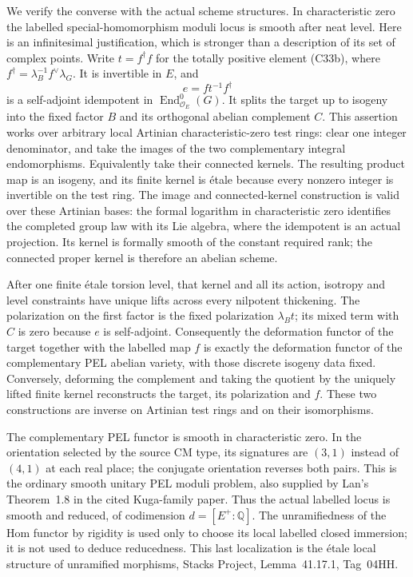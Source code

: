 \documentclass[11pt]{article}
\newcommand{\Q}{\mathbb Q}\newcommand{\C}{\mathbb C}\newcommand{\Z}{\mathbb Z}\newcommand{\R}{\mathbb R}\newcommand{\A}{\mathbb A}\newcommand{\OO}{\mathcal O}
\theoremstyle{definition}\newtheorem{definition}[theorem]{Definition}\newtheorem{remark}[theorem]{Remark}
\begin{document}
We verify the converse with the actual
scheme structures. In characteristic zero
the labelled special-homomorphism moduli
locus is smooth after neat level. Here is
an infinitesimal justification, which is
stronger than a description of its set
of complex points. Write $t=f^\dagger f$
for the totally positive element (C33b),
where $f^\dagger=\lambda_B^{-1}f^\vee\lambda_G$.
It is invertible in $E$, and
\[
                  e=f t^{-1}f^\dagger
\]
is a self-adjoint idempotent in
$\operatorname{End}^0_{\mathcal O_E}(G)$.
It splits the target up to isogeny into
the fixed factor $B$ and its orthogonal
abelian complement $C$. This assertion
works over arbitrary local Artinian
characteristic-zero test rings: clear
one integer denominator, and take the
images of the two complementary integral
endomorphisms. Equivalently take their
connected kernels. The resulting product
map is an isogeny, and its finite kernel
is \'etale because every nonzero integer
is invertible on the test ring.
The image and connected-kernel construction
is valid over these Artinian bases: the
formal logarithm in characteristic zero
identifies the completed group law with
its Lie algebra, where the idempotent is
an actual projection. Its kernel is
formally smooth of the constant required
rank; the connected proper kernel is
therefore an abelian scheme.

After one finite \'etale torsion level,
that kernel and all its action, isotropy
and level constraints have unique lifts
across every nilpotent thickening. The
polarization on the first factor is the
fixed polarization $\lambda_B t$; its
mixed term with $C$ is zero because
$e$ is self-adjoint. Consequently the
deformation functor of the target
together with the labelled map $f$
is exactly the deformation functor of
the complementary PEL abelian variety,
with those discrete isogeny data fixed.
Conversely, deforming the complement
and taking the quotient by the uniquely
lifted finite kernel reconstructs the
target, its polarization and $f$.
These two constructions are inverse
on Artinian test rings and on their
isomorphisms.

The complementary PEL functor is smooth
in characteristic zero. In the orientation
selected by the source CM type, its
signatures are $(3,1)$ instead of
$(4,1)$ at each real place; the conjugate
orientation reverses both pairs. This
is the ordinary smooth unitary PEL
moduli problem, also supplied by Lan's
Theorem~1.8 in the cited Kuga-family
paper. Thus the actual labelled locus
is smooth and reduced, of codimension
$d=[E^+:\Q]$. The unramifiedness of the
Hom functor by rigidity is used only
to choose its local labelled closed
immersion; it is not used to deduce
reducedness. This last localization is
the \'etale local structure of unramified
morphisms, Stacks Project, Lemma~41.17.1,
Tag~04HH.
\end{document}
